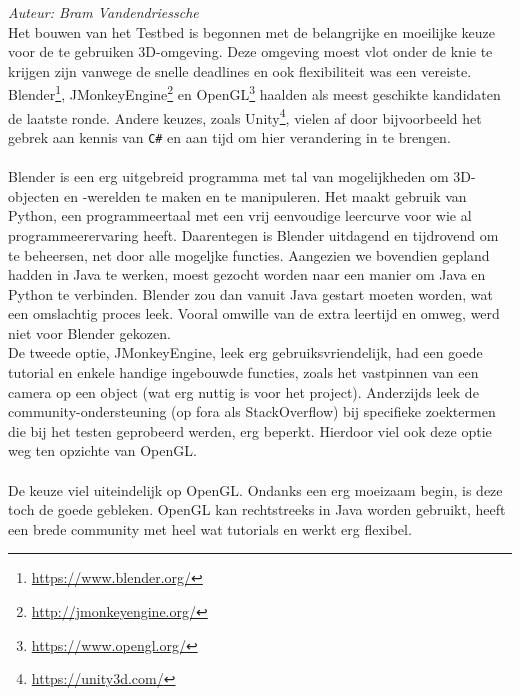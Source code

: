 {\em Auteur: Bram Vandendriessche}\\

\noindent
Het bouwen van het Testbed is begonnen met de belangrijke en moeilijke keuze voor de te gebruiken 3D-omgeving. Deze omgeving moest vlot onder de knie te krijgen zijn vanwege de snelle deadlines en ook flexibiliteit was een vereiste. Blender\footnote{\url{https://www.blender.org/}}, JMonkeyEngine\footnote{\url{http://jmonkeyengine.org/}} en OpenGL\footnote{\url{https://www.opengl.org/}} haalden als meest geschikte kandidaten de laatste ronde. Andere keuzes, zoals Unity\footnote{\url{https://unity3d.com/}}, vielen af door bijvoorbeeld het gebrek aan kennis van \texttt{C\#} en aan tijd om hier verandering in te brengen.\\
~\\
Blender is een erg uitgebreid programma met tal van mogelijkheden om 3D-objecten en -werelden te maken en te manipuleren. Het maakt gebruik van Python, een programmeertaal met een vrij eenvoudige leercurve voor wie al programmeerervaring heeft. Daarentegen is Blender uitdagend en tijdrovend om te beheersen, net door alle mogeljke functies. Aangezien we bovendien gepland hadden in Java te werken, moest gezocht worden naar een manier om Java en Python te verbinden. Blender zou dan vanuit Java gestart moeten worden, wat een omslachtig proces leek. Vooral omwille van de extra leertijd en omweg, werd niet voor Blender gekozen. \\
De tweede optie, JMonkeyEngine, leek erg gebruiksvriendelijk, had een goede tutorial en enkele handige ingebouwde functies, zoals het vastpinnen van een camera op een object (wat erg nuttig is voor het project). Anderzijds leek de community-ondersteuning (op fora als StackOverflow) bij specifieke zoektermen die bij het testen geprobeerd werden, erg beperkt. Hierdoor viel ook deze optie weg ten opzichte van OpenGL.\\
\\
De keuze viel uiteindelijk op OpenGL. Ondanks een erg moeizaam begin, is deze toch de goede gebleken. OpenGL kan rechtstreeks in Java worden gebruikt, heeft een brede community met heel wat tutorials en werkt erg flexibel.







